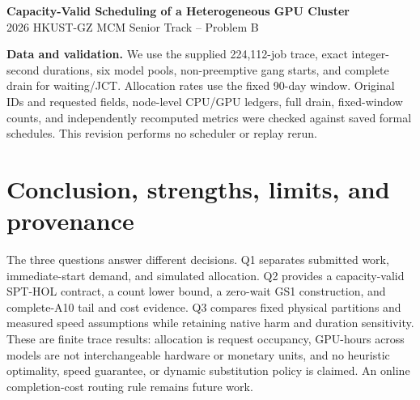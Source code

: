 

\begin{center}
{\Large\bfseries\color{primary} Capacity-Valid Scheduling of a Heterogeneous GPU Cluster}\\[3pt]
{\large 2026 HKUST-GZ MCM Senior Track -- Problem B}\\[5pt]
\end{center}
\textbf{Data and validation.} We use the supplied 224,112-job trace, exact integer-second durations, six model pools, non-preemptive gang starts, and complete drain for waiting/JCT. Allocation rates use the fixed 90-day window. Original IDs and requested fields, node-level CPU/GPU ledgers, full drain, fixed-window counts, and independently recomputed metrics were checked against saved formal schedules. This revision performs no scheduler or replay rerun.





\section{Conclusion, strengths, limits, and provenance}
The three questions answer different decisions. Q1 separates submitted work, immediate-start demand, and simulated allocation. Q2 provides a capacity-valid SPT-HOL contract, a count lower bound, a zero-wait GS1 construction, and complete-A10 tail and cost evidence. Q3 compares fixed physical partitions and measured speed assumptions while retaining native harm and duration sensitivity. These are finite trace results: allocation is request occupancy, GPU-hours across models are not interchangeable hardware or monetary units, and no heuristic optimality, speed guarantee, or dynamic substitution policy is claimed. An online completion-cost routing rule remains future work.

